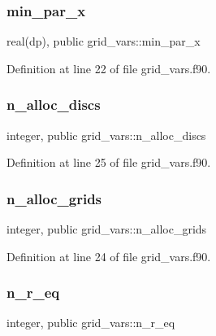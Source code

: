 \subsubsection{\texorpdfstring{min\+\_\+par\+\_\+x}{min\_par\_x}}
{\footnotesize\ttfamily real(dp), public grid\+\_\+vars\+::min\+\_\+par\+\_\+x}



Definition at line 22 of file grid\+\_\+vars.\+f90.

\mbox{\label{namespacegrid__vars_a23b5e4789dc5d3d0d6dadeb47909ddbd}} 
\subsubsection{\texorpdfstring{n\+\_\+alloc\+\_\+discs}{n\_alloc\_discs}}
{\footnotesize\ttfamily integer, public grid\+\_\+vars\+::n\+\_\+alloc\+\_\+discs}



Definition at line 25 of file grid\+\_\+vars.\+f90.

\mbox{\label{namespacegrid__vars_ac4b43443d16af06fdc62d542b3eadee2}} 
\subsubsection{\texorpdfstring{n\+\_\+alloc\+\_\+grids}{n\_alloc\_grids}}
{\footnotesize\ttfamily integer, public grid\+\_\+vars\+::n\+\_\+alloc\+\_\+grids}



Definition at line 24 of file grid\+\_\+vars.\+f90.

\mbox{\label{namespacegrid__vars_aa3785d71892d3d7db81aca0b6aa880b0}} 
\subsubsection{\texorpdfstring{n\+\_\+r\+\_\+eq}{n\_r\_eq}}
{\footnotesize\ttfamily integer, public grid\+\_\+vars\+::n\+\_\+r\+\_\+eq}



